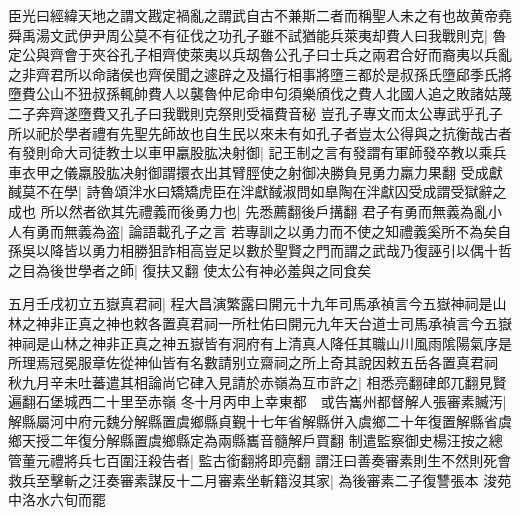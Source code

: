 臣光曰經緯天地之謂文戡定禍亂之謂武自古不兼斯二者而稱聖人未之有也故黄帝堯舜禹湯文武伊尹周公莫不有征伐之功孔子雖不試猶能兵萊夷却費人曰我戰則克|{
	魯定公與齊會于夾谷孔子相齊使萊夷以兵刼魯公孔子曰士兵之兩君合好而裔夷以兵亂之非齊君所以命諸侯也齊侯聞之遽辟之及攝行相事將墮三都於是叔孫氏墮郈季氏將墮費公山不狃叔孫輒帥費人以襲魯仲尼命申句須樂頎伐之費人北國人追之敗諸姑蔑二子奔齊遂墮費又孔子曰我戰則克祭則受福費音秘}
豈孔子專文而太公專武乎孔子所以祀於學者禮有先聖先師故也自生民以來未有如孔子者豈太公得與之抗衡哉古者有發則命大司徒教士以車甲臝股肱决射御|{
	記王制之言有發謂有軍師發卒教以乘兵車衣甲之儀羸股肱决射御謂擐衣出其臂脛使之射御决勝負見勇力羸力果翻}
受成獻馘莫不在學|{
	詩魯頌泮水曰矯矯虎臣在泮獻馘淑問如臯陶在泮獻囚受成謂受獄辭之成也}
所以然者欲其先禮義而後勇力也|{
	先悉薦翻後戶搆翻}
君子有勇而無義為亂小人有勇而無義為盗|{
	論語載孔子之言}
若專訓之以勇力而不使之知禮義奚所不為矣自孫吳以降皆以勇力相勝狙詐相高豈足以數於聖賢之門而謂之武哉乃復誣引以偶十哲之目為後世學者之師|{
	復扶又翻}
使太公有神必羞與之同食矣

五月壬戌初立五嶽真君祠|{
	程大昌演繁露曰開元十九年司馬承禎言今五嶽神祠是山林之神非正真之神也敕各置真君祠一所杜佑曰開元九年天台道士司馬承禎言今五嶽神祠是山林之神非正真之神五嶽皆有洞府有上清真人降任其職山川風雨隂陽氣序是所理焉冠冕服章佐從神仙皆有名數請别立齋祠之所上奇其說因敕五岳各置真君祠}
秋九月辛未吐蕃遣其相論尚它硉入見請於赤嶺為互市許之|{
	相悉亮翻硉郎兀翻見賢遍翻石堡城西二十里至赤嶺}
冬十月丙申上幸東都　或告巂州都督解人張審素贓汚|{
	解縣屬河中府元魏分解縣置虞鄉縣貞覲十七年省解縣併入虞鄉二十年復置解縣省虞鄉天授二年復分解縣置虞鄉縣定為兩縣巂音髓解戶買翻}
制遣監察御史楊汪按之總管董元禮將兵七百圍汪殺告者|{
	監古銜翻將即亮翻}
謂汪曰善奏審素則生不然則死會救兵至擊斬之汪奏審素謀反十二月審素坐斬籍沒其家|{
	為後審素二子復讐張本}
浚苑中洛水六旬而罷

